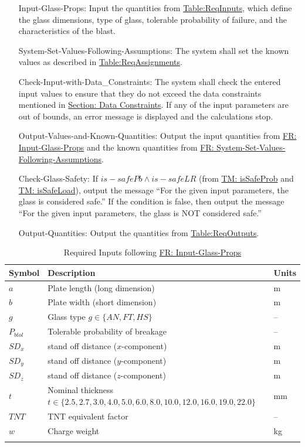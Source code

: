 \documentclass[12pt]{article}
\begin{document}
\begin{itemize}
\item[Input-Glass-Props:\phantomsection\label{inputGlassProps}]Input the quantities from \hyperref[Table:ReqInputs]{Table:ReqInputs}, which define the glass dimensions, type of glass, tolerable probability of failure, and the characteristics of the blast.
\item[System-Set-Values-Following-Assumptions:\phantomsection\label{sysSetValsFollowingAssumps}]The system shall set the known values as described in \hyperref[Table:ReqAssignments]{Table:ReqAssignments}.
\item[Check-Input-with-Data\_Constraints:\phantomsection\label{checkInputWithDataCons}]The system shall check the entered input values to ensure that they do not exceed the data constraints mentioned in \hyperref[Sec:DataConstraints]{Section: Data Constraints}. If any of the input parameters are out of bounds, an error message is displayed and the calculations stop.
\item[Output-Values-and-Known-Quantities:\phantomsection\label{outputValsAndKnownQuants}]Output the input quantities from \hyperref[inputGlassProps]{FR: Input-Glass-Props} and the known quantities from \hyperref[sysSetValsFollowingAssumps]{FR: System-Set-Values-Following-Assumptions}.
\item[Check-Glass-Safety:\phantomsection\label{checkGlassSafety}]If $is-safePb\land{}is-safeLR$ (from \hyperref[TM:isSafeProb]{TM: isSafeProb} and \hyperref[TM:isSafeLoad]{TM: isSafeLoad}), output the message ``For the given input parameters, the glass is considered safe.'' If the condition is false, then output the message ``For the given input parameters, the glass is NOT considered safe.''
\item[Output-Quantities:\phantomsection\label{outputQuants}]Output the quantities from \hyperref[Table:ReqOutputs]{Table:ReqOutputs}.
\end{itemize}
\begin{longtabu}{l X[l] l}
\toprule
\textbf{Symbol} & \textbf{Description} & \textbf{Units}
\\
\midrule
\endhead
$a$ & Plate length (long dimension) & m
\\
$b$ & Plate width (short dimension) & m
\\
$g$ & Glass type $g\in{}\{AN,FT,HS\}$ & --
\\
${P_{btol}}$ & Tolerable probability of breakage & --
\\
${SD_{x}}$ & stand off distance ($x$-component) & m
\\
${SD_{y}}$ & stand off distance ($y$-component) & m
\\
${SD_{z}}$ & stand off distance ($z$-component) & m
\\
$t$ & Nominal thickness $t\in{}\{2.5,2.7,3.0,4.0,5.0,6.0,8.0,10.0,12.0,16.0,19.0,22.0\}$ & mm
\\
$TNT$ & TNT equivalent factor & --
\\
$w$ & Charge weight & kg
\\
\bottomrule
\caption{Required Inputs following \hyperref[inputGlassProps]{FR: Input-Glass-Props}}
\label{Table:ReqInputs}
\end{longtabu}
\end{document}
